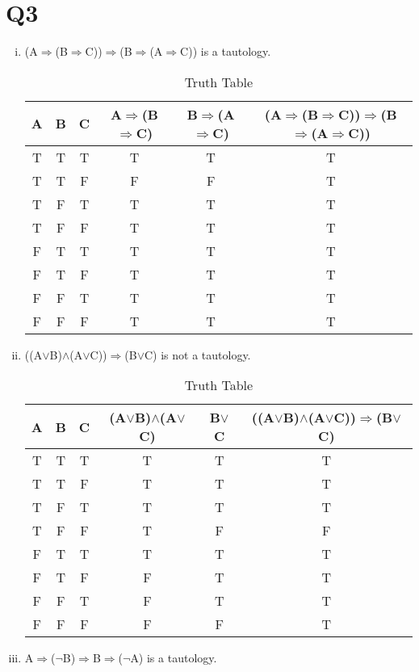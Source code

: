 \documentclass[12pt]{article}
\begin{document}
\section{Q3}
\begin{enumerate}[(i)]
\item
(A$\Rightarrow$(B$\Rightarrow$C))$\Rightarrow$(B$\Rightarrow$(A$\Rightarrow$C)) is a tautology.
\begin{table}[H]
\centering
\begin{tabular}{|c|c|c|c|c|c|}
\hline
A & B &C  &A$\Rightarrow$(B$\Rightarrow$C) &B$\Rightarrow$(A$\Rightarrow$C)&(A$\Rightarrow$(B$\Rightarrow$C))$\Rightarrow$(B$\Rightarrow$(A$\Rightarrow$C)) \\ \hline
T & T &T  &T  &T  &T\\ \hline
T & T &F  &F  &F  &T \\ \hline
T & F &T  &T  &T  &T\\ \hline
T & F &F  &T  &T  &T\\ \hline
F & T &T  &T  &T  &T\\ \hline
F & T &F  &T  &T  &T \\ \hline
F & F &T  &T  &T  &T\\ \hline
F & F &F  &T  &T  &T\\ \hline
\end{tabular}
\caption{Truth Table}
\end{table}
\item
((A$\vee$B)$\wedge$(A$\vee$C))$\Rightarrow$(B$\vee$C) is not a tautology.
\begin{table}[H]
\centering
\begin{tabular}{|c|c|c|c|c|c|}
\hline
A & B &C  &(A$\vee$B)$\wedge$(A$\vee$C)&B$\vee$C&((A$\vee$B)$\wedge$(A$\vee$C))$\Rightarrow$(B$\vee$C) \\ \hline
T & T &T  &T  &T  &T\\ \hline
T & T &F  &T  &T  &T \\ \hline
T & F &T  &T  &T  &T\\ \hline
T & F &F  &T  &F  &F\\ \hline
F & T &T  &T  &T  &T\\ \hline
F & T &F  &F  &T  &T \\ \hline
F & F &T  &F  &T  &T\\ \hline
F & F &F  &F  &F  &T\\ \hline
\end{tabular}
\caption{Truth Table}
\end{table}
\item
A$\Rightarrow$($\neg$B)$\Rightarrow$B$\Rightarrow$($\neg$A) is a tautology.

\end{enumerate}
\end{document}
